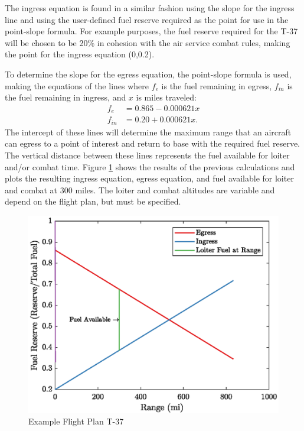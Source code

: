 The ingress equation is found in a similar fashion using the slope for the ingress line and using the user-defined fuel reserve required as the point for use in the point-slope formula. For example purposes, the fuel reserve required  for the T-37 will be chosen to be 20\% in cohesion with the air service combat rules, making the point for the ingress equation (0,0.2).\par
To determine the slope for the egress equation, the point-slope formula is used, making the equations of the lines where $f_e$ is the fuel remaining in egress, $f_{in}$ is the fuel remaining in ingress, and $x$ is miles traveled:
\begin{align*}
    f_e &= 0.865 - 0.000621x\\
    f_{in} &= 0.20 + 0.000621x.
\end{align*}
The intercept of these lines will determine the maximum range that an aircraft can egress to a point of interest and return to base with the required fuel reserve. The vertical distance between these lines represents the fuel available for loiter and/or combat time. Figure \ref{fig:exT37} shows the results of the previous calculations and plots the resulting ingress equation, egress equation, and fuel available for loiter and combat at 300 miles. The loiter and combat altitudes are variable and depend on the flight plan, but must be specified.\par
\begin{figure} [H]
    \centering
    \includegraphics{Thesis/Method/ExampleFlightT37.eps}
    \caption{Example Flight Plan T-37}
    \label{fig:exT37}
\end{figure}
